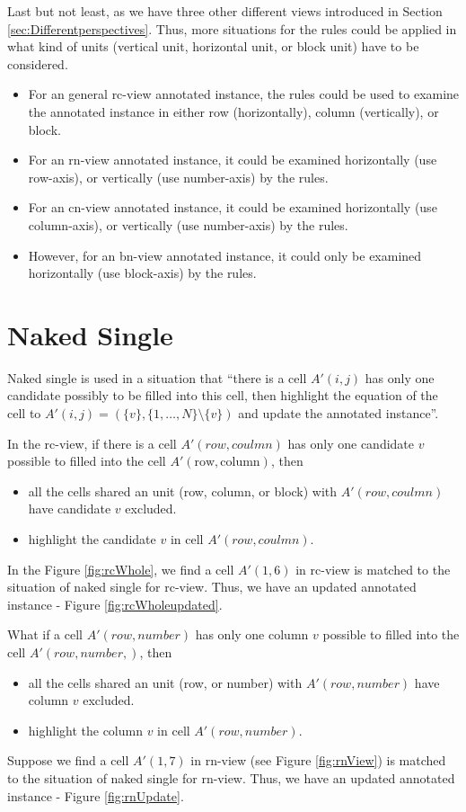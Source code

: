 \documentclass[11pt]{report}
\newcommand{\set}[1]{\{ #1 \}}
\begin{document}
Last but not least, as we have three other different views introduced in Section \ref{sec:Differentperspectives}. Thus, more situations for the rules could be applied in what kind of units (vertical unit, horizontal unit, or block unit) have to be considered.
\begin{itemize}
\item For an general rc-view annotated instance, the rules could be used to examine the annotated instance in either row (horizontally), column (vertically), or block.
\item For an rn-view annotated instance, it could be examined horizontally (use row-axis), or vertically (use number-axis) by the rules.
\item For an cn-view annotated instance, it could be examined horizontally (use column-axis), or vertically (use number-axis) by the rules.
\item However, for an bn-view annotated instance, it could only be examined horizontally (use block-axis) by the rules.
\end{itemize}

\section{Naked Single}
\label{sec:Nakedsingle}

Naked single is used in a situation that ``there is a cell $A'(i,j)$ has only one candidate possibly to be filled into this cell, then highlight the equation of the cell to $A'(i,j) =(\set{v}, \set{1,\dots,N} \setminus \set{v})$ and update the annotated instance''.

In the rc-view, if there is a cell $A'(row, coulmn)$ has only one candidate $v$ possible to filled into the cell $A'(\text{row}, \text{column})$, then
\begin{itemize}
\item all the cells shared an unit (row, column, or block) with $A'(row, coulmn)$ have candidate $v$ excluded.
\item highlight the candidate $v$ in cell $A'(row, coulmn)$.
\end{itemize}
In the Figure \ref{fig:rcWhole}, we find a cell $A'(1, 6)$ in rc-view is matched to the situation of naked single for rc-view. Thus, we have an updated annotated instance - Figure \ref{fig:rcWholeupdated}.

What if a cell $A'(row, number)$ has only one column $v$ possible to filled into the cell $A'(row, number,)$, then
\begin{itemize}
\item all the cells shared an unit (row, or number) with $A'(row, number)$ have column $v$ excluded.
\item highlight the column $v$ in cell $A'(row, number)$.
\end{itemize}
Suppose we find a cell $A'(1, 7)$ in rn-view (see Figure \ref{fig:rnView}) is matched to the situation of naked single for rn-view. Thus, we have an updated annotated instance - Figure \ref{fig:rnUpdate}.
\end{document}
